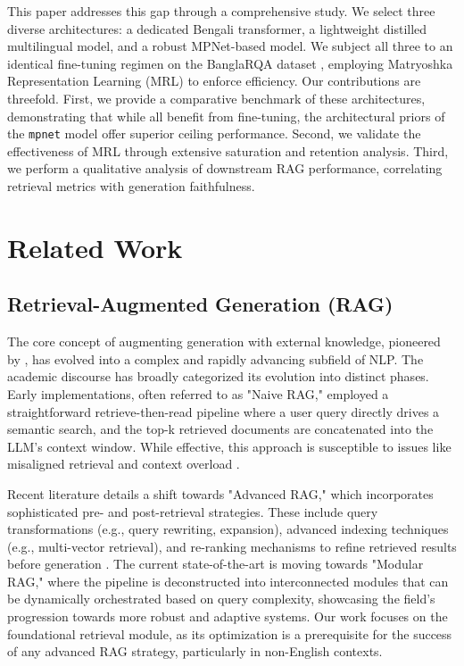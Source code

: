 \documentclass[manuscript,screen,review]{acmart}
\begin{document}
This paper addresses this gap through a comprehensive study. We select three diverse architectures: a dedicated Bengali transformer, a lightweight distilled multilingual model, and a robust MPNet-based model. We subject all three to an identical fine-tuning regimen on the BanglaRQA dataset \cite{ekram2022banglarqa}, employing Matryoshka Representation Learning (MRL) \cite{kusupati2022matryoshka} to enforce efficiency. Our contributions are threefold. First, we provide a comparative benchmark of these architectures, demonstrating that while all benefit from fine-tuning, the architectural priors of the \texttt{mpnet} model offer superior ceiling performance. Second, we validate the effectiveness of MRL through extensive saturation and retention analysis. Third, we perform a qualitative analysis of downstream RAG performance, correlating retrieval metrics with generation faithfulness.

\section{Related Work}

\subsection{Retrieval-Augmented Generation (RAG)}
The core concept of augmenting generation with external knowledge, pioneered by \cite{lewis2020retrieval}, has evolved into a complex and rapidly advancing subfield of NLP. The academic discourse has broadly categorized its evolution into distinct phases. Early implementations, often referred to as "Naive RAG," employed a straightforward retrieve-then-read pipeline where a user query directly drives a semantic search, and the top-k retrieved documents are concatenated into the LLM's context window. While effective, this approach is susceptible to issues like misaligned retrieval and context overload \cite{hu2024comprehensive}.

Recent literature details a shift towards "Advanced RAG," which incorporates sophisticated pre- and post-retrieval strategies. These include query transformations (e.g., query rewriting, expansion), advanced indexing techniques (e.g., multi-vector retrieval), and re-ranking mechanisms to refine retrieved results before generation \cite{gao2023survey}. The current state-of-the-art is moving towards "Modular RAG," where the pipeline is deconstructed into interconnected modules that can be dynamically orchestrated based on query complexity, showcasing the field's progression towards more robust and adaptive systems. Our work focuses on the foundational retrieval module, as its optimization is a prerequisite for the success of any advanced RAG strategy, particularly in non-English contexts.
\end{document}
